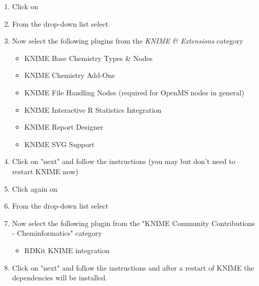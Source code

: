 \begin{enumerate}
\item Click on 
\item From the  drop-down list select \menu{\KnimeUpdateSite}
\item Now select the following plugins from the \textit{KNIME \& Extensions} category
    \begin{itemize}
    \item KNIME Base Chemistry Types \& Nodes
    \item KNIME Chemistry Add-Ons
    \item KNIME File Handling Nodes (required for OpenMS nodes in general)
    \item KNIME Interactive R Statistics Integration
    \item KNIME Report Designer
    \item KNIME SVG Support
    \end{itemize}
\item Click on "next" and follow the instructions (you may but don't need to restart KNIME now)
\item Click again on 
\item From the  drop-down list select \\\menu{\KnimeTrustedSite}
\item Now select the following plugin from the "KNIME Community Contributions - Cheminformatics" category 	
    \begin{itemize}
    \item     RDKit KNIME integration
    \end{itemize}	
\item Click on "next" and follow the instructions and after a restart of KNIME the dependencies will be installed.
\end{enumerate}

